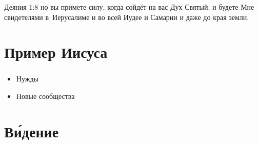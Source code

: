 \documentclass[t,aspectratio=169,14pt]{beamer}  %
\begin{document}
\begin{frame}
	\frametitle{\insertsection}

	\begin{block}{Деяния 1:8}
		но вы \linebreak 
		\hphantom{a} примете силу, \hphantom{M}когда сойдёт на вас Дух Святый;\linebreak 
		и будете Мне свидетелями \linebreak 
		\hphantom{MM} в~Иерусалиме \linebreak
		\hphantom{MM} и во всей Иудее \linebreak
		\hphantom{MM} и Самарии \linebreak
		\hphantom{MM} и даже до края земли.
	\end{block}
\end{frame} 
\section{Пример Иисуса}

\begin{frame}
	\frametitle{\insertsection}

\begin{itemize}
	\item Нужды
	\item Новые сообщества
\end{itemize}

\end{frame}
\section{В\'{и}дение}
\begin{frame}[c]
	\frametitle{\insertsection}
	\framesubtitle{\insertsubsection}

\end{frame}
\end{document}
